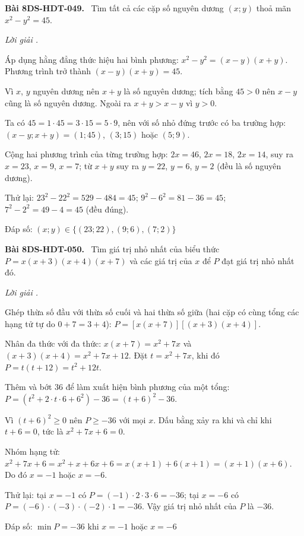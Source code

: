 \documentclass[12pt,a4paper]{article}
\newenvironment{problem}[1][]{\par\medskip\noindent\textbf{Bài #1.}\ }{\par}
\newenvironment{solution}[1][]{\par\noindent\textit{Lời giải #1.}\par}{\par}
\begin{document}
\begin{problem}[8DS-HDT-049]
Tìm tất cả các cặp số nguyên dương $(x; y)$ thoả mãn $x^2 - y^2 = 45$.

\begin{solution}
Áp dụng hằng đẳng thức hiệu hai bình phương: $x^2 - y^2 = (x - y)(x + y)$. Phương trình trở thành $(x - y)(x + y) = 45$.

Vì $x$, $y$ nguyên dương nên $x + y$ là số nguyên dương; tích bằng $45 > 0$ nên $x - y$ cũng là số nguyên dương. Ngoài ra $x + y > x - y$ vì $y > 0$.

Ta có $45 = 1 \cdot 45 = 3 \cdot 15 = 5 \cdot 9$, nên với số nhỏ đứng trước có ba trường hợp: $(x - y; x + y) = (1; 45)$, $(3; 15)$ hoặc $(5; 9)$.

Cộng hai phương trình của từng trường hợp: $2x = 46$, $2x = 18$, $2x = 14$, suy ra $x = 23$, $x = 9$, $x = 7$; từ $x + y$ suy ra $y = 22$, $y = 6$, $y = 2$ (đều là số nguyên dương).

Thử lại: $23^2 - 22^2 = 529 - 484 = 45$; $9^2 - 6^2 = 81 - 36 = 45$; $7^2 - 2^2 = 49 - 4 = 45$ (đều đúng).

Đáp số: $\boxed{(x; y) \in \{(23; 22), (9; 6), (7; 2)\}}$
\end{solution}
\end{problem}

\begin{problem}[8DS-HDT-050]
Tìm giá trị nhỏ nhất của biểu thức $P = x(x + 3)(x + 4)(x + 7)$ và các giá trị của $x$ để $P$ đạt giá trị nhỏ nhất đó.

\begin{solution}
Ghép thừa số đầu với thừa số cuối và hai thừa số giữa (hai cặp có cùng tổng các hạng tử tự do $0 + 7 = 3 + 4$): $P = \left[x(x + 7)\right]\left[(x + 3)(x + 4)\right]$.

Nhân đa thức với đa thức: $x(x + 7) = x^2 + 7x$ và $(x + 3)(x + 4) = x^2 + 7x + 12$. Đặt $t = x^2 + 7x$, khi đó $P = t(t + 12) = t^2 + 12t$.

Thêm và bớt $36$ để làm xuất hiện bình phương của một tổng: $P = (t^2 + 2 \cdot t \cdot 6 + 6^2) - 36 = (t + 6)^2 - 36$.

Vì $(t + 6)^2 \geq 0$ nên $P \geq -36$ với mọi $x$. Dấu bằng xảy ra khi và chỉ khi $t + 6 = 0$, tức là $x^2 + 7x + 6 = 0$.

Nhóm hạng tử: $x^2 + 7x + 6 = x^2 + x + 6x + 6 = x(x + 1) + 6(x + 1) = (x + 1)(x + 6)$. Do đó $x = -1$ hoặc $x = -6$.

Thử lại: tại $x = -1$ có $P = (-1) \cdot 2 \cdot 3 \cdot 6 = -36$; tại $x = -6$ có $P = (-6) \cdot (-3) \cdot (-2) \cdot 1 = -36$. Vậy giá trị nhỏ nhất của $P$ là $-36$.

Đáp số: $\boxed{\min P = -36 \text{ khi } x = -1 \text{ hoặc } x = -6}$
\end{solution}
\end{problem}
\end{document}
